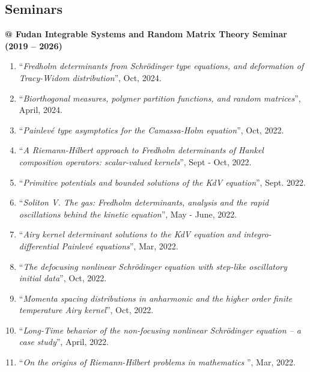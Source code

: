 \documentclass[margin]{res}
\begin{document}
\begin{resume}
\section{Seminars}
\textbf{@ Fudan Integrable Systems and Random Matrix Theory Seminar (2019 -- 2026)}
\begin{enumerate}[--]
\item ``{\sl Fredholm determinants from Schr\"odinger type equations, and deformation of Tracy-Widom distribution}'', Oct, 2024.
\item ``{\sl Biorthogonal measures, polymer partition functions, and random matrices}'', April, 2024.
\item ``{\sl Painlev\'e type asymptotics for the Camassa-Holm equation}'', Oct, 2022.
\item ``{\sl A Riemann-Hilbert approach to Fredholm determinants of Hankel composition operators: scalar-valued kernels}'', Sept - Oct, 2022.
\item ``{\sl Primitive potentials and bounded solutions of the KdV equation}'', Sept. 2022.
\item ``{\sl Soliton V. The gas: Fredholm determinants, analysis and the rapid oscillations behind the kinetic equation}'', May - June, 2022.
\item ``{\sl Airy kernel determinant solutions to the KdV equation and integro-differential Painlev\'e equations}'', Mar, 2022.
\item ``{\sl The defocusing nonlinear Schr\"odinger equation with step-like oscillatory initial data}'', Oct, 2022.
\item ``{\sl Momenta spacing distributions in anharmonic and the higher order finite temperature Airy kernel}'', Oct, 2022.
\item ``{\sl Long-Time behavior of the non-focusing nonlinear Schr\"odinger equation -- a case study}'', April, 2022.
\item ``{\sl On the origins of Riemann-Hilbert problems in mathematics} '', Mar, 2022.
\end{enumerate}



\end{resume}
\end{document}
